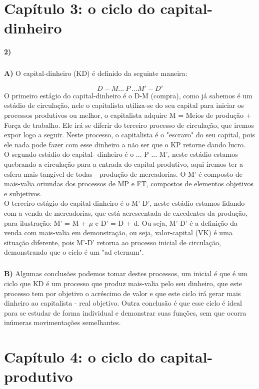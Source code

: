 \documentclass[a4paper, 12pt]{article} %
\begin{document}
\par \section{Capítulo 3: o ciclo do capital-dinheiro}
\vspace{0.5cm}
\par \textbf{2)}
\subparagraph{} \textbf{A)} O capital-dinheiro (KD) é definido da seguinte maneira: 

\begin{equation}
D-M... \ P \ ... M'-D'
\end{equation}
O primeiro estágio do capital-dinheiro é o D-M (compra), como já sabemos é um estádio de circulação, nele o capitalista utiliza-se do seu capital para iniciar os processos produtivos ou melhor, o capitalista adquire M = Meios de produção + Força de trabalho. Ele irá se diferir do terceiro processo de circulação, que iremos expor logo a seguir. Neste processo, o capitalista é o "escravo" do seu capital, pois ele nada pode fazer com esse dinheiro a não ser que o KP retorne dando lucro.
\\
O segundo estádio do capital- dinheiro é o ... P ... M', neste estádio estamos quebrando a circulação para a entrada do capital produtivo, aqui iremos ter a esfera mais tangível de todas - produção de mercadorias. O M' é composto de mais-valia oriundas dos processos de MP e FT, compostos de elementos objetivos e subjetivos.
\\
O terceiro estágio do capital-dinheiro é o M'-D', neste estádio estamos lidando com a venda de mercadorias, que está acrescentada de excedentes da produção, para ilustração: M' = M + $\mu$ e D' = D + d. Ou seja, M'-D' é a definição da venda com mais-valia em demonstração, ou seja, valor-capital (VK) é uma situação diferente, pois M'-D' retorna ao processo inicial de circulação, demonstrando que o ciclo é um "ad eternum".

\subparagraph{} \textbf{B)} Algumas conclusões podemos tomar destes processos, um inicial é que é um ciclo que KD é um processo que produz mais-valia pelo seu dinheiro, que este processo tem por objetivo o acréscimo de valor e que este ciclo irá gerar mais dinheiro ao capitalista - real objetivo. Outra conclusão é que esse ciclo é ideal para se estudar de forma individual e demonstrar suas funções, sem que ocorra inúmeras movimentações semelhantes.

\vspace{0.5cm}

\par \section{Capítulo 4: o ciclo do capital-produtivo}
\vspace{0.5cm}
\end{document}
